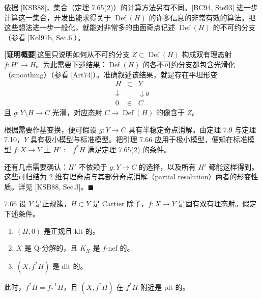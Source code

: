 
依据 [KSB88]，集合（定理 7.65(2)）的计算方法另有不同。[BC94, Ste93] 进一步计算这一集合，开发出能求得关于 $\operatorname{Def}(H)$ 的许多信息的非常有效的算法。把这些想法进一步一般化，就能对非常多的曲面奇点记述 $\operatorname{Def}(H)$ 的不可约分支（参看 [Kol91b, Sec.6]）。

\textbf{[证明概要]}\quad 这里只说明如何从不可约分支 $Z\subset\operatorname{Def}(H)$ 构成双有理态射 $f\colon H'\to H$。为此需要下述结果：$\operatorname{Def}(H)$ 的各不可约分支都包含光滑化（smoothing）（参看 [Art74]）。准确叙述该结果，就是存在平坦形变
\[
\begin{array}{ccc}
H & \subset & Y\\
\downarrow & & \downarrow{g}\\
0 & \in & C
\end{array}
\]
且 $g\colon Y\setminus H\to C$ 光滑，对应态射 $C\to\operatorname{Def}(H)$ 的像含于 $Z$。

根据需要作基变换，便可假设 $g\colon Y\to C$ 具有半稳定奇点消解。由定理 7.9 与定理 7.10，$Y$ 具有极小模型与标准模型。把引理 7.66 应用于极小模型，便知在标准模型 $f\colon X\to Y$ 上 $H':=f^*H$ 满足定理 7.65(2) 的条件。

还有几点需要确认：$H'$ 不依赖于 $g\colon Y\to C$ 的选择，以及所有 $H'$ 都能这样得到。这些可归结为 2 维有理奇点与其部分奇点消解（partial resolution）两者的形变性质。详见 [KSB88, Sec.3]。\hfill$\blacksquare$
\begin{lemmap}{7.66}
设 $Y$ 是正规簇，$H\subset Y$ 是 Cartier 除子，$f\colon X\to Y$ 是固有双有理态射。假定下述条件。
\begin{enumerate}[label=(\arabic*),leftmargin=2.4em,itemsep=1pt,topsep=2pt,parsep=0pt]
\item $(H,0)$ 是正规且 klt 的。
\item $X$ 是 Q-分解的，且 $K_X$ 是 $f$-nef 的。
\item $(X,f^*H)$ 是 dlt 的。
\end{enumerate}
此时，$f^*H=f_*^{-1}H$，且 $(X,f^*H)$ 在 $f^*H$ 附近是 plt 的。
\end{lemmap}

